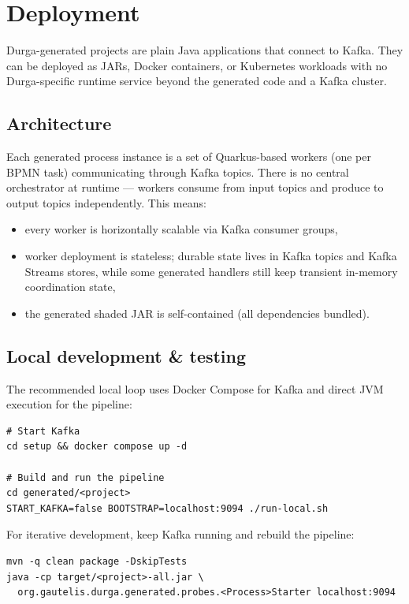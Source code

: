 \section{Deployment}
\label{sec:Deployment}

Durga-generated projects are plain Java applications that connect to Kafka.
They can be deployed as JARs, Docker containers, or Kubernetes workloads
with no Durga-specific runtime service beyond the generated code and a Kafka
cluster.

\subsection{Architecture}

Each generated process instance is a set of Quarkus-based workers (one per
BPMN task) communicating through Kafka topics. There is no central orchestrator
at runtime --- workers consume from input topics and produce to output topics
independently. This means:

\begin{itemize}
\item every worker is horizontally scalable via Kafka consumer groups,
\item worker deployment is stateless; durable state lives in Kafka topics and
  Kafka Streams stores, while some generated handlers still keep transient
  in-memory coordination state,
\item the generated shaded JAR is self-contained (all dependencies bundled).
\end{itemize}

\subsection{Local development \& testing}

The recommended local loop uses Docker Compose for Kafka and direct JVM
execution for the pipeline:

\begin{verbatim}
# Start Kafka
cd setup && docker compose up -d

# Build and run the pipeline
cd generated/<project>
START_KAFKA=false BOOTSTRAP=localhost:9094 ./run-local.sh
\end{verbatim}

For iterative development, keep Kafka running and rebuild the pipeline:

\begin{verbatim}
mvn -q clean package -DskipTests
java -cp target/<project>-all.jar \
  org.gautelis.durga.generated.probes.<Process>Starter localhost:9094
\end{verbatim}

